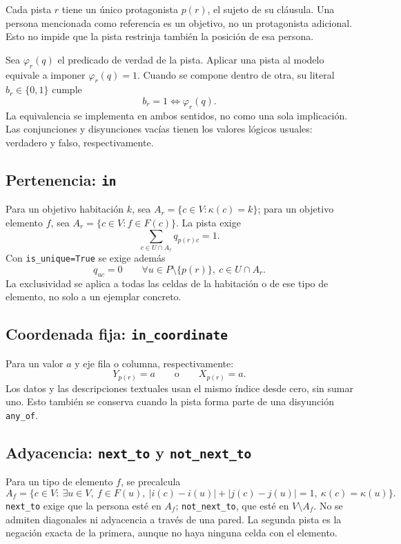 \documentclass[11pt,a4paper]{article}
\newcommand{\B}{\{0,1\}}
\begin{document}
Cada pista $r$ tiene un \'unico protagonista $p(r)$, el sujeto de su
cl\'ausula. Una persona mencionada como referencia es un objetivo,
no un protagonista adicional. Esto no impide que la pista restrinja
tambi\'en la posici\'on de esa persona.

Sea $\varphi_r(q)$ el predicado de verdad de la pista. Aplicar una
pista al modelo equivale a imponer $\varphi_r(q)=1$. Cuando se
compone dentro de otra, su literal $b_r\in\B$ cumple
\[
 b_r=1\Longleftrightarrow\varphi_r(q).
\]
La equivalencia se implementa en ambos sentidos, no como una sola
implicaci\'on. Las conjunciones y disyunciones vac\'ias tienen los
valores l\'ogicos usuales: verdadero y falso, respectivamente.

\subsection{Pertenencia: \texttt{in}}

Para un objetivo habitaci\'on $k$, sea
$A_r=\{c\in V:\kappa(c)=k\}$; para un objetivo elemento $f$, sea
$A_r=\{c\in V:f\in F(c)\}$. La pista exige
\[
 \sum_{c\in U\cap A_r}q_{p(r)c}=1.
\]
Con \texttt{is\_unique=True} se exige adem\'as
\[
 q_{uc}=0\qquad
 \forall u\in P\setminus\{p(r)\},\ c\in U\cap A_r.
\]
La exclusividad se aplica a todas las celdas de la habitaci\'on o
de ese tipo de elemento, no solo a un ejemplar concreto.

\subsection{Coordenada fija: \texttt{in\_coordinate}}

Para un valor $a$ y eje fila o columna, respectivamente:
\[
 Y_{p(r)}=a\qquad\text{o}\qquad X_{p(r)}=a.
\]
Los datos y las descripciones textuales usan el mismo \'indice desde
cero, sin sumar uno. Esto tambi\'en se conserva cuando la pista
forma parte de una disyunci\'on \texttt{any\_of}.

\subsection{Adyacencia: \texttt{next\_to} y \texttt{not\_next\_to}}

Para un tipo de elemento $f$, se precalcula
\[
 A_f=\{c\in V:\ \exists u\in V,\ f\in F(u),\
 |i(c)-i(u)|+|j(c)-j(u)|=1,\ \kappa(c)=\kappa(u)\}.
\]
\texttt{next\_to} exige que la persona est\'e en $A_f$;
\texttt{not\_next\_to}, que est\'e en $V\setminus A_f$.
No se admiten diagonales ni adyacencia a trav\'es de una pared.
La segunda pista es la negaci\'on exacta de la primera, aunque no
haya ninguna celda con el elemento.
\end{document}
